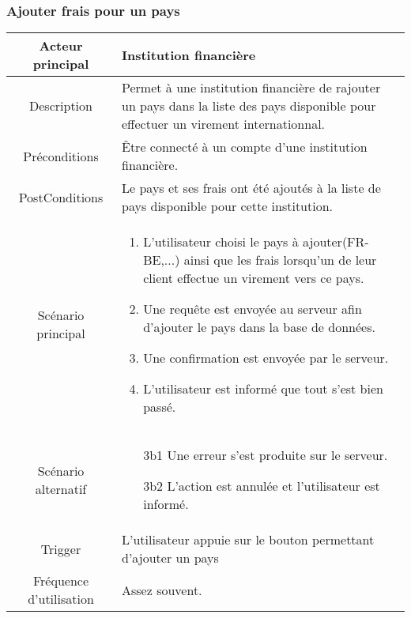 \documentclass{article}
\begin{document}
\newpage

\subsubsection{Ajouter frais pour un pays}
\begin{table}[h]
   \begin{tabular}{|c|p{10cm}|}
      \hline
      Acteur principal&Institution financière\\
      \hline
      Description&Permet à une institution financière de rajouter un pays dans la liste des pays disponible pour effectuer un virement internationnal.\\
      \hline
      Préconditions&Être connecté à un compte d'une institution financière.\\
      \hline
      PostConditions&Le pays et ses frais ont été ajoutés à la liste de pays disponible pour cette institution.\\
      \hline
      Scénario principal& 
            \begin{enumerate}
               \item L'utilisateur choisi le pays à ajouter(FR-BE,...) ainsi que les frais lorsqu'un de leur client effectue un virement vers ce pays.
               \item Une requête est envoyée au serveur afin d'ajouter le pays dans la base de données.
               \item Une confirmation est envoyée par le serveur.
               \item L'utilisateur est informé que tout s'est bien passé.
            \end{enumerate}     \\
      \hline
      Scénario alternatif&
            \begin{itemize}
               \item[3b1] Une erreur s'est produite sur le serveur.
               \item[3b2] L'action est annulée et l'utilisateur est informé.  
            \end{itemize}\\
      \hline
      Trigger&L'utilisateur appuie sur le bouton permettant d'ajouter un pays\\
      \hline
      Fréquence d'utilisation&Assez souvent.\\
      \hline
   \end{tabular}
\end{table}
\end{document}
